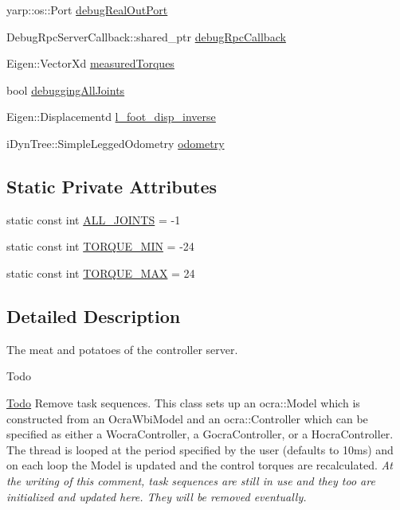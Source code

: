 \begin{DoxyCompactItemize}
yarp\+::os\+::\+Port \hyperlink{classThread_a9bd7f6aebc0be4709f32f95aa32f1add}{debug\+Real\+Out\+Port}
\item 
Debug\+Rpc\+Server\+Callback\+::shared\+\_\+ptr \hyperlink{classThread_a42833af67d5280e6946a31a03737e017}{debug\+Rpc\+Callback}
\item 
Eigen\+::\+Vector\+Xd \hyperlink{classThread_aa9cbe8744e51571a17fa726d8d16a0c6}{measured\+Torques}
\item 
bool \hyperlink{classThread_aba345996b91a57d9e1f2dd15c7c75e08}{debugging\+All\+Joints}
\item 
Eigen\+::\+Displacementd \hyperlink{classThread_a304e7ee40ec0ceec2fc7ca80353ab478}{l\+\_\+foot\+\_\+disp\+\_\+inverse}
\item 
i\+Dyn\+Tree\+::\+Simple\+Legged\+Odometry \hyperlink{classThread_a23a41c6ccd1df898084112cfd46120f3}{odometry}
\end{DoxyCompactItemize}
\subsection*{Static Private Attributes}
\begin{DoxyCompactItemize}
\item 
static const int \hyperlink{classThread_a875b3311a39e3b87dbc981f2db7b1b9d}{A\+L\+L\+\_\+\+J\+O\+I\+N\+TS} = -\/1
\item 
static const int \hyperlink{classThread_ad44e5fbda8070c252ea71823a4b9a6db}{T\+O\+R\+Q\+U\+E\+\_\+\+M\+IN} = -\/24
\item 
static const int \hyperlink{classThread_a5e864394c4bd0fbdf3cba7f6f825e17d}{T\+O\+R\+Q\+U\+E\+\_\+\+M\+AX} = 24
\end{DoxyCompactItemize}


\subsection{Detailed Description}
The meat and potatoes of the controller server. 

\begin{DoxyRefDesc}{Todo}
\item[\hyperlink{todo__todo000001}{Todo}]Remove task sequences. This class sets up an ocra\+::\+Model which is constructed from an Ocra\+Wbi\+Model and an ocra\+::\+Controller which can be specified as either a Wocra\+Controller, a Gocra\+Controller, or a Hocra\+Controller. The thread is looped at the period specified by the user (defaults to 10ms) and on each loop the Model is updated and the control torques are recalculated. {\itshape At the writing of this comment, task sequences are still in use and they too are initialized and updated here. They will be removed eventually.} \end{DoxyRefDesc}


